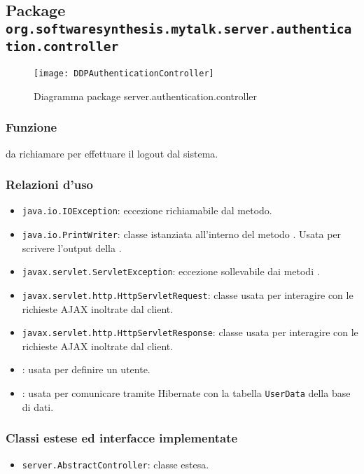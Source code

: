\subsection{Package \texttt{org.softwaresynthesis.mytalk.server.authentication.controller}}\label{sec:autservlet}

\begin{center}
\begin{figure}[H]
  \texttt{[image: DDPAuthenticationController]}
\caption{Diagramma package server.authentication.controller}
\end{figure}
\end{center}


\subsubsection*{Funzione}
 da richiamare per effettuare il logout dal sistema.

\subsubsection*{Relazioni d'uso}
\begin{itemize}
	\item \texttt{java.io.IOException}: eccezione richiamabile dal metodo.
	\item \texttt{java.io.PrintWriter}: classe istanziata all'interno del metodo . Usata per scrivere l'output della .
	\item \texttt{javax.servlet.ServletException}: eccezione sollevabile dai metodi .
	\item \texttt{javax.servlet.http.HttpServletRequest}: classe usata per interagire con le richieste AJAX inoltrate dal client.
	\item \texttt{javax.servlet.http.HttpServletResponse}: classe usata per interagire con le richieste AJAX inoltrate dal client.
	\item {}: usata per definire un utente.
	\item {}: usata per comunicare tramite Hibernate con la tabella \texttt{UserData} della base di dati.
\end{itemize}

\subsubsection*{Classi estese ed interfacce implementate}
\begin{itemize}
	\item \texttt{server.AbstractController}: classe estesa.
\end{itemize}

